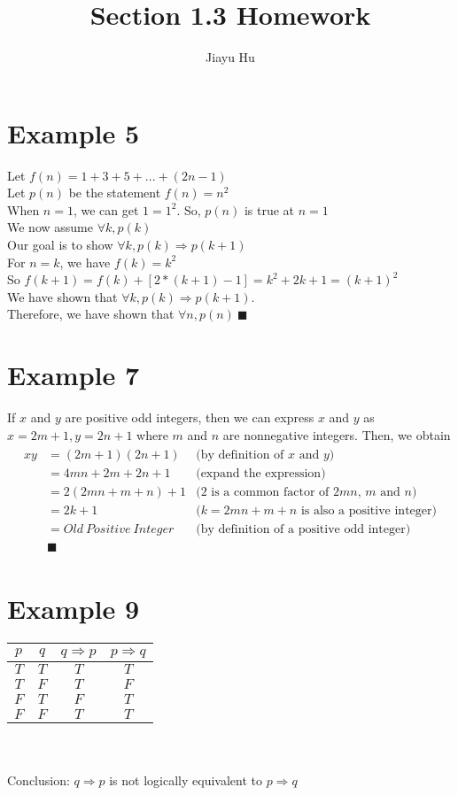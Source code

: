 \documentclass[12pt,a4paper]{article}
\title{Section 1.3 Homework}
\author{Jiayu Hu}
\begin{document}
\bfseries
\maketitle

\section*{Example 5}
Let $f(n)=1+3+5+...+(2n-1)$\\
Let $p(n)$ be the statement $f(n)=n^2$\\
When $n=1$, we can get $1=1^2$. So, $p(n)$ is true at $n=1$\\
We now assume $\forall k, p(k)$\\
Our goal is to show $\forall k, p(k)\Rightarrow p(k+1)$\\
For $n=k$, we have $f(k)=k^2$\\
So $f(k+1)=f(k)+[2*(k+1)-1]=k^2+2k+1=(k+1)^2$\\
We have shown that $\forall k, p(k)\Rightarrow p(k+1)$.\\  Therefore, we have shown that $\forall n, p(n)\ \blacksquare$

\section*{Example 7}
If $x$ and $y$ are positive odd integers, then we can express $x$ and $y$ as $x=2m+1, y=2n+1$ where $m$ and $n$ are nonnegative integers. Then, we obtain
\begin{eqnarray*}
\begin{aligned}
xy&=(2m+1)(2n+1)&\text{(by definition of $x$ and $y$)}\\
  &=4mn+2m+2n+1 &\text{(expand the expression)}\\
  &=2(2mn+m+n)+1&\text{($2$ is a common factor of $2mn$,\ $m$ and $n$)} \\
  &=2k+1 &\text{($k=2mn+m+n$ is also a positive integer)}\\
  &=Old\ Positive\ Integer &\text{(by definition of a positive odd integer)}\\
  &\blacksquare
\end{aligned}
\end{eqnarray*}

\section*{Example 9}

\begin{tabular}{|c|c|c|c|}
\hline
$p$ & $q$ & $q\Rightarrow p$ & $p\Rightarrow q$\\ \hline
$T$ & $T$ & $T$ & $T$\\ \hline
$T$ & $F$ & $T$ & $F$\\ \hline
$F$ & $T$ & $F$ & $T$\\ \hline
$F$ & $F$ & $T$ & $T$\\ \hline
\end{tabular}
\\\\
Conclusion: $q\Rightarrow p$ is not logically equivalent to $p\Rightarrow q$
\end{document}
